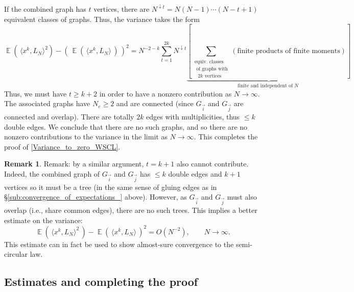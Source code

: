\documentclass[letterpaper,11pt,oneside,reqno]{amsart}
\numberwithin{equation}{section}
\DeclareMathOperator{\EE}{\mathbb{E}}
\theoremstyle{definition}
\newtheorem{remark}[proposition]{Remark}
\begin{document}
If the combined graph has $ t $ vertices, there are $ N^{ \downarrow t } = N ( N - 1 ) \cdots ( N - t + 1 ) $ equivalent classes of graphs.  Thus, the variance takes the form
\begin{equation*}
\EE ( \, \langle x^k , L_N \rangle^2 ) - \left( \, \EE ( \, \langle x^k , L_N \rangle \, ) \, \right)^2 = N^{ -2 - k } \sum_{ t = 1 }^{ 2k } N^{ \downarrow t } \underbrace{ \left[ \sum_{ \substack{ \text{equiv. classes} \\ \text{ of graphs with} \\ \text{ $2k$ vertices } } } ( \text{finite products of finite moments} )\right] }_{ \text{ finite and independent of $N$ } }
\end{equation*}
Thus, we must have $ t \ge k + 2 $ in order to have a nonzero contribution as $ N \to \infty $.  
The associated graphs have $ N_e \ge 2 $ and are connected (since $ G_{ \vec{i} } $ and $ G_{ \vec{j} } $ are connected and overlap).
There are totally $ 2 k $ edges with multiplicities, thus  $\le k $ double edges.
We conclude that there are no such graphs, and so there are no nonzero contributions to the 
variance in the limit as $N\to\infty$. This 
completes the proof of \eqref{Variance_to_zero_WSCL}.

\begin{remark}
	Remark: by a similar argument, $ t = k + 1 $ also cannot contribute.
	Indeed, the combined graph of $ G_{ \vec{i} } $ and $ G_{ \vec{j} } $
	has $\le k$ double edges and $k+1$ vertices so it must be a tree
	(in the same sense of gluing edges as in \S \ref{sub:convergence_of_expectations_} above).
	However, as $ G_{ \vec{i} } $ and $ G_{ \vec{j} } $ must also overlap (i.e., share common edges),
	there are no such trees.
	This implies a better estimate on the variance:
	\begin{equation*}
	\EE \left( \, \langle x^k , L_N \rangle^2 \, \right) - \EE \left( \, \langle x^k , L_N \rangle \, \right)^2 = O( N^{-2} ) ,
	\qquad
	N\to\infty.
	\end{equation*}
	This estimate can in fact be used to show almost-sure convergence to the semi-circular law.
\end{remark}


\subsection{Estimates and completing the proof} %
\label{sub:completing_the_proof_WSCL}
\end{document}
